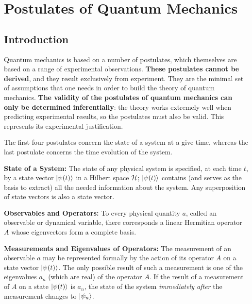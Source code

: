 \section{Postulates of Quantum Mechanics}

\subsection{Introduction}

Quantum mechanics is based on a number of postulates, which themselves are based on a range of experimental observations. \textbf{These postulates cannot be derived}, and they result exclusively from experiment. They are the minimal set of assumptions that one needs in order to build the theory of quantum mechanics. \textbf{The validity of the postulates of quantum mechanics can only be determined inferentially}: the theory works extremely well when predicting experimental results, so the postulates must also be valid. This represents its experimental justification.

The first four postulates concern the state of a system at a give time, whereas the last postulate concerns the time evolution of the system.

\begin{postulate} \label{post_1}
    \textbf{State of a System:} The state of any physical system is specified, at each time $t$, by a state vector $\ket{\psi(t)}$ in a Hilbert space $\mathcal{H}$; $\ket{\psi(t)}$ contains (and serves as the basis to extract) all the needed information about the system. Any superposition of state vectors is also a state vector.
\end{postulate}

\begin{postulate} \label{post_2}
    \textbf{Observables and Operators:} To every physical quantity $a$, called an observable or dynamical variable, there corresponds a linear Hermitian operator $A$ whose eigenvectors form a complete basis.
\end{postulate}

\begin{postulate} \label{post_3}
    \textbf{Measurements and Eigenvalues of Operators:} The measurement of an observable $a$ may be represented formally by the action of its operator $A$ on a state vector $\ket{\psi(t)}$. The only possible result of such a measurement is one of the eigenvalues $a_n$ (which are real) of the operator $A$. If the result of a measurement of $A$ on a state $\ket{\psi(t)}$ is $a_n$, the state of the system \textit{immediately after} the measurement changes to $\ket{\psi_n}$.
\end{postulate}


